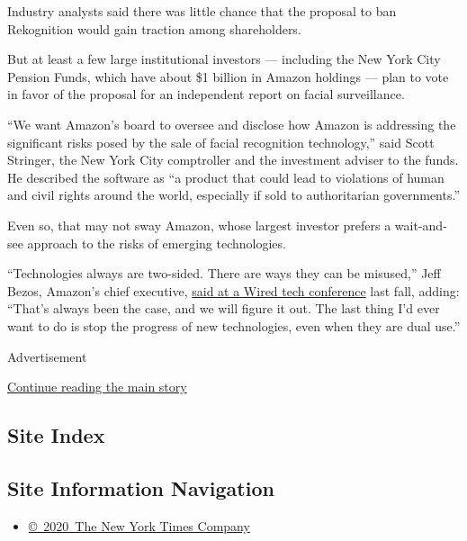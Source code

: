 Industry analysts said there was little chance that the proposal to ban
Rekognition would gain traction among shareholders.

But at least a few large institutional investors --- including the New
York City Pension Funds, which have about \$1 billion in Amazon holdings
--- plan to vote in favor of the proposal for an independent report on
facial surveillance.

``We want Amazon's board to oversee and disclose how Amazon is
addressing the significant risks posed by the sale of facial recognition
technology,'' said Scott Stringer, the New York City comptroller and the
investment adviser to the funds. He described the software as ``a
product that could lead to violations of human and civil rights around
the world, especially if sold to authoritarian governments.''

Even so, that may not sway Amazon, whose largest investor prefers a
wait-and-see approach to the risks of emerging technologies.

``Technologies always are two-sided. There are ways they can be
misused,'' Jeff Bezos, Amazon's chief executive,
\href{https://www.wired.com/story/amazons-jeff-bezos-says-tech-companies-should-work-with-the-pentagon/}{said
at a Wired tech conference} last fall, adding: ``That's always been the
case, and we will figure it out. The last thing I'd ever want to do is
stop the progress of new technologies, even when they are dual use.''

Advertisement

\protect\hyperlink{after-bottom}{Continue reading the main story}

\hypertarget{site-index}{%
\subsection{Site Index}\label{site-index}}

\hypertarget{site-information-navigation}{%
\subsection{Site Information
Navigation}\label{site-information-navigation}}

\begin{itemize}
\tightlist
\item
  \href{https://help.nytimes3xbfgragh.onion/hc/en-us/articles/115014792127-Copyright-notice}{©~2020~The
  New York Times Company}
\end{itemize}

